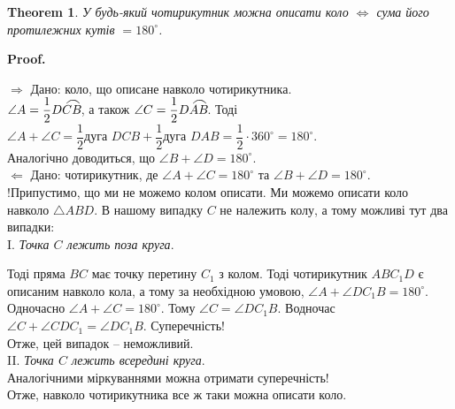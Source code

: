 \documentclass[a4paper, 10pt]{article}
\makeatletter
\def\rightproof{$\boxed{\Rightarrow}$ }
\def\leftproof{$\boxed{\Leftarrow}$ }
\theoremstyle{theoremdd}
\newtheorem{theorem}{Theorem}[subsection]
\theoremstyle{theoremdd}
\theoremstyle{theoremdd}
\theoremstyle{theoremdd}
\theoremstyle{theoremdd}
\theoremstyle{theoremdd}
\theoremstyle{theoremdd}
\theoremstyle{theoremdd}
\theoremstyle{theoremdd}
\renewenvironment{proof}[1][Proof.\\]{\par
\pushQED{\hfill \qed}%
\normalfont \topsep6\p@\@plus6\p@\relax
\trivlist
\item\relax
{\bfseries
#1\@addpunct{.}}\hspace\labelsep\ignorespaces
}{%
\popQED\endtrivlist\@endpefalse
}
\newcommand{\tarc}{\mbox{\large$\frown$}}
\newcommand{\arc}[2][-3ex]{{#2}{\kern #1{\raisebox{1.5ex}{\tarc}}}}
\makeatother
\begin{document}
\begin{theorem}
У будь-який чотирикутник можна описати коло $\iff$ сума його протилежних кутів $= 180^\circ$.
\end{theorem}

\begin{proof}
\rightproof Дано: коло, що описане навколо чотирикутника.\\
$\angle A = \dfrac{1}{2} \arc{DCB}$, а також $\angle C = \dfrac{1}{2} \arc{DAB}$. Тоді\\
$\angle A + \angle C = \dfrac{1}{2} \text{дуга } DCB + \dfrac{1}{2} \text{дуга } DAB = \dfrac{1}{2} \cdot 360^\circ = 180^\circ$.\\
Аналогічно доводиться, що $\angle B + \angle D = 180^\circ$.
\bigskip \\
\leftproof Дано: чотирикутник, де $\angle A + \angle C = 180^\circ$ та $\angle B + \angle D = 180^\circ$.\\
!Припустимо, що ми не можемо колом описати. Ми можемо описати коло навколо $\triangle ABD$. В нашому випадку $C$ не належить колу, а тому можливі тут два випадки:\\
I. \textit{Точка $C$ лежить поза круга}.
\begin{figure}[H]
\centering
{}
\end{figure}
Тоді пряма $BC$ має точку перетину $C_1$ з колом. Тоді чотирикутник $ABC_1D$ є описаним навколо кола, а тому за необхідною умовою, $\angle A + \angle DC_1B = 180^\circ$. Одночасно $\angle A + \angle C = 180^\circ$. Тому $\angle C = \angle DC_1B$. Водночас $\angle C + \angle CDC_1 = \angle DC_1B$. Суперечність!\\
Отже, цей випадок -- неможливий.
\bigskip \\
II. \textit{Точка $C$ лежить всередині круга}.\\
Аналогічними міркуваннями можна отримати суперечність!\\
Отже, навколо чотирикутника все ж таки можна описати коло.
\end{proof}
\end{document}
